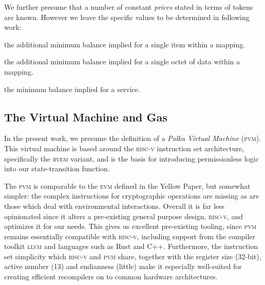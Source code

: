 We further presume that a number of constant \emph{prices} stated in terms of tokens are known. However we leave the specific values to be determined in following work:

\begin{description}\label{eq:prices}
  \item[$\mathsf{B}_I$] the additional minimum balance implied for a single item within a mapping.
  \item[$\mathsf{B}_L$] the additional minimum balance implied for a single octet of data within a mapping.
  \item[$\mathsf{B}_S$] the minimum balance implied for a service.
\end{description}




















\subsection{The Virtual Machine and Gas}\label{sec:virtualmachineandgas}

In the present work, we presume the definition of a \emph{Polka Virtual Machine} (\textsc{pvm}). This virtual machine is based around the \textsc{risc-v} instruction set architecture, specifically the \textsc{rv}\textsc{em} variant, and is the basis for introducing permissionless logic into our state-transition function.

The \textsc{pvm} is comparable to the \textsc{evm} defined in the Yellow Paper, but somewhat simpler: the complex instructions for cryptographic operations are missing as are those which deal with environmental interactions. Overall it is far less opinionated since it alters a pre-existing general purpose design, \textsc{risc-v}, and optimizes it for our needs. This gives us excellent pre-existing tooling, since \textsc{pvm} remains essentially compatible with \textsc{risc-v}, including support from the compiler toolkit \textsc{llvm} and languages such as Rust and C++. Furthermore, the instruction set simplicity which \textsc{risc-v} and \textsc{pvm} share, together with the register size (32-bit), active number (13) and endianness (little) make it especially well-suited for creating efficient recompilers on to common hardware architectures.

